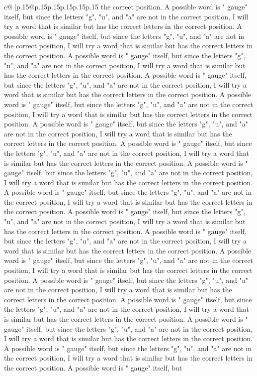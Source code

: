 \documentclass{article}
\begin{document}
{\begin{supertabular}{c@{$\;$}|p{.15\linewidth}@{}p{.15\linewidth}p{.15\linewidth}p{.15\linewidth}p{.15\linewidth}p{.15\linewidth}}
{{{the correct position. A possible word is " gauge" itself, but since the letters "g", "u", and "a" are not in the correct position, I will try a word that is similar but has the correct letters in the correct position. A possible word is " gauge" itself, but since the letters "g", "u", and "a" are not in the correct position, I will try a word that is similar but has the correct letters in the correct position. A possible word is " gauge" itself, but since the letters "g", "u", and "a" are not in the correct position, I will try a word that is similar but has the correct letters in the correct position. A possible word is " gauge" itself, but since the letters "g", "u", and "a" are not in the correct position, I will try a word that is similar but has the correct letters in the correct position. A possible word is " gauge" itself, but since the letters "g", "u", and "a" are not in the correct position, I will try a word that is similar but has the correct letters in the correct position. A possible word is " gauge" itself, but since the letters "g", "u", and "a" are not in the correct position, I will try a word that is similar but has the correct letters in the correct position. A possible word is " gauge" itself, but since the letters "g", "u", and "a" are not in the correct position, I will try a word that is similar but has the correct letters in the correct position. A possible word is " gauge" itself, but since the letters "g", "u", and "a" are not in the correct position, I will try a word that is similar but has the correct letters in the correct position. A possible word is " gauge" itself, but since the letters "g", "u", and "a" are not in the correct position, I will try a word that is similar but has the correct letters in the correct position. A possible word is " gauge" itself, but since the letters "g", "u", and "a" are not in the correct position, I will try a word that is similar but has the correct letters in the correct position. A possible word is " gauge" itself, but since the letters "g", "u", and "a" are not in the correct position, I will try a word that is similar but has the correct letters in the correct position. A possible word is " gauge" itself, but since the letters "g", "u", and "a" are not in the correct position, I will try a word that is similar but has the correct letters in the correct position. A possible word is " gauge" itself, but since the letters "g", "u", and "a" are not in the correct position, I will try a word that is similar but has the correct letters in the correct position. A possible word is " gauge" itself, but since the letters "g", "u", and "a" are not in the correct position, I will try a word that is similar but has the correct letters in the correct position. A possible word is " gauge" itself, but since the letters "g", "u", and "a" are not in the correct position, I will try a word that is similar but has the correct letters in the correct position. A possible word is " gauge" itself, but since the letters "g", "u", and "a" are not in the correct position, I will try a word that is similar but has the correct letters in the correct position. A possible word is " gauge" itself, but }}}
\end{supertabular}}
\end{document}
